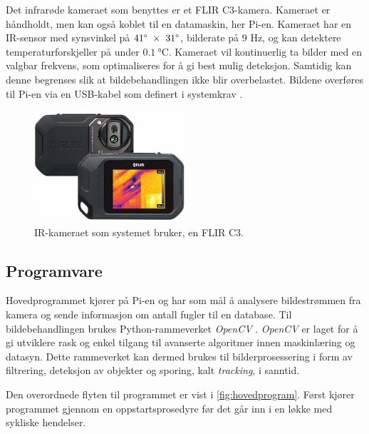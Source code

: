Det infrarøde kameraet som benyttes er et FLIR C3-kamera.
Kameraet er håndholdt, men kan også koblet til en datamaskin, her Pi-en. 
Kameraet har en IR-sensor med synsvinkel på $41\degree\ \times\ 31\degree$, bilderate på 9 Hz, og kan detektere temperaturforskjeller på under $\SI{0.1}{\celsius}$. 
Kameraet vil kontinuerlig ta bilder med en valgbar frekvens, som optimaliseres for å gi best mulig deteksjon. 
Samtidig kan denne begrenses slik at bildebehandlingen ikke blir overbelastet. 
Bildene overføres til Pi-en via en USB-kabel som definert i systemkrav .


\begin{figure}[H]
    \centering
    \includegraphics[width=0.5\textwidth]{implementering/c3.png}
    \caption{IR-kameraet som systemet bruker, en FLIR C3.}
    \label{fig:c3}
\end{figure}


\subsection{Programvare}\label{sec:impl:programvare} 

Hovedprogrammet kjører på Pi-en og har som mål å analysere bildestrømmen fra kamera og sende informasjon om antall fugler til en database.
Til bildebehandlingen brukes Python-rammeverket \textit{OpenCV} \cite{OpenCV}. 
\textit{OpenCV} er laget for å gi utviklere rask og enkel tilgang til avanserte algoritmer innen maskinlæring og datasyn.
Dette rammeverket kan dermed brukes til bilderprosessering i form av filtrering, deteksjon av objekter og sporing, kalt \textit{tracking}, i sanntid.

Den overordnede flyten til programmet er vist i \autoref{fig:hovedprogram}. 
Først kjører programmet gjennom en oppstartsprosedyre før det går inn i en løkke med sykliske hendelser.

